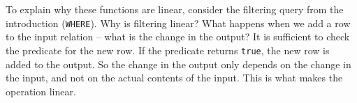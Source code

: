 To explain why these functions are linear, consider the filtering
query from the introduction (\texttt{WHERE}).  Why is filtering
linear?  What happens when we add a row to the input relation -- what
is the change in the output?  It is sufficient to check the predicate
for the new row.  If the predicate returns \texttt{true}, the new row
is added to the output.  So the change in the output only depends on
the change in the input, and not on the actual contents of the input.
This is what makes the operation linear.

%
%
%
%
